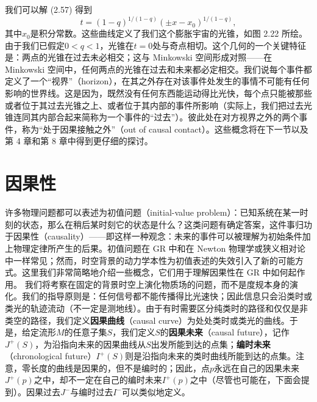 我们可以解 (2.57) 得到
\begin{equation*}
t=(1-q)^{1/(1-q)}\left(\pm x-x_0\right)^{1/(1-q)},
\tag{2.62}
\end{equation*}
其中$x_0$是积分常数。这些曲线定义了我们这个膨胀宇宙的光锥，如图 2.22 所绘。由于我们已假定$0<q<1$，光锥在$t=0$处与奇点相切。这个几何的一个关键特征是：两点的光锥在过去未必相交；这与 Minkowski 空间形成对照——在 Minkowski 空间中，任何两点的光锥在过去和未来都必定相交。我们说每个事件都定义了一个“视界”（horizon），在其之外存在对该事件处发生的事情不可能有任何影响的世界线。这是因为，既然没有任何东西能运动得比光快，每个点只能被那些或者位于其过去光锥之上、或者位于其内部的事件所影响（实际上，我们把过去光锥连同其内部合起来简称为一个事件的“过去”）。彼此处在对方视界之外的两个事件，称为“处于因果接触之外”（out of causal contact）。这些概念将在下一节以及第 4 章和第 8 章中得到更仔细的探讨。

\section{因果性}

许多物理问题都可以表述为初值问题（initial-value problem）：已知系统在某一时刻的状态，那么在稍后某时刻它的状态是什么？这类问题有确定答案，这件事归功于因果性（causality）——即这样一种观念：未来的事件可以被理解为初始条件加上物理定律所产生的后果。初值问题在 GR 中和在 Newton 物理学或狭义相对论中一样常见；然而，时空背景的动力学本性为初值表述的失效引入了新的可能方式。这里我们非常简略地介绍一些概念，它们用于理解因果性在 GR 中如何起作用。
我们将考察在固定的背景时空上演化物质场的问题，而不是度规本身的演化。我们的指导原则是：任何信号都不能传播得比光速快；因此信息只会沿类时或类光的轨迹流动（不一定是测地线）。由于有时需要区分纯类时的路径和仅仅是非类空的路径，我们定义\textbf{因果曲线}（causal curve）为处处类时或类光的曲线。于是，给定流形$M$的任意子集$S$，我们定义$S$的\textbf{因果未来}（causal future），记作$J^+(S)$，为沿指向未来的因果曲线从$S$出发所能到达的点集；\textbf{编时未来}（chronological future）$I^+(S)$则是沿指向未来的类时曲线所能到达的点集。注意，零长度的曲线是因果的，但不是编时的；因此，点$p$永远在自己的因果未来$J^+(p)$之中，却不一定在自己的编时未来$I^+(p)$之中（尽管也可能在，下面会提到）。因果过去$J^-$与编时过去$I^-$可以类似地定义。

